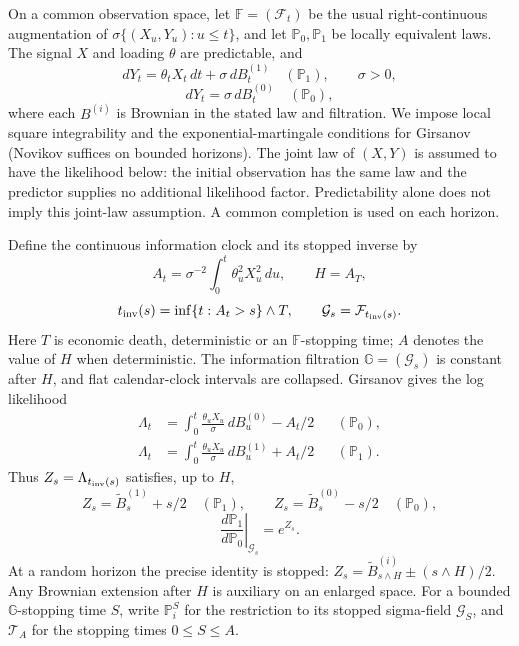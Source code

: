 \documentclass[11pt]{article}
\numberwithin{equation}{section}
\theoremstyle{plain}
\theoremstyle{definition}
\theoremstyle{remark}
\newcommand{\Pzero}{\mathbb P_0}
\newcommand{\Pone}{\mathbb P_1}
\newcommand{\Fobs}{\mathbb F}
\newcommand{\Ginfo}{\mathbb G}
\begin{document}
On a common observation space, let $\Fobs=(\mathcal F_t)$ be the usual right-continuous augmentation of $\sigma\{(X_u,Y_u):u\le t\}$, and let $\Pzero,\Pone$ be locally equivalent laws. The signal $X$ and loading $\theta$ are predictable, and
\begin{equation}\label{eq:observed-channel-alt}
dY_t=\theta_tX_t\,dt+\sigma\,dB_t^{(1)}\quad(\Pone),\qquad \sigma>0,
\end{equation}
\begin{equation}\label{eq:observed-channel-null}
dY_t=\sigma\,dB_t^{(0)}\quad(\Pzero),
\end{equation}
where each $B^{(i)}$ is Brownian in the stated law and filtration. We impose local square integrability and the exponential-martingale conditions for Girsanov (Novikov suffices on bounded horizons). The joint law of $(X,Y)$ is assumed to have the likelihood below: the initial observation has the same law and the predictor supplies no additional likelihood factor. Predictability alone does not imply this joint-law assumption. A common completion is used on each horizon.

Define the continuous information clock and its stopped inverse by
\begin{equation}\label{eq:information-clock}
A_t=\sigma^{-2}\int_0^t\theta_u^2X_u^2\,du,\qquad H=A_T,
\end{equation}
\begin{equation}\label{eq:inverse-information-clock}
t_{\rm inv}(s)=\inf\{t:A_t>s\}\wedge T,\qquad \mathcal G_s=\mathcal F_{t_{\rm inv}(s)}.
\end{equation}
Here $T$ is economic death, deterministic or an $\Fobs$-stopping time; $A$ denotes the value of $H$ when deterministic. The information filtration $\Ginfo=(\mathcal G_s)$ is constant after $H$, and flat calendar-clock intervals are collapsed. Girsanov gives the log likelihood
\begin{align}
\Lambda_t&=\int_0^t\frac{\theta_uX_u}{\sigma}\,dB_u^{(0)}-A_t/2 &&(\Pzero),\label{eq:llr-null}\\
\Lambda_t&=\int_0^t\frac{\theta_uX_u}{\sigma}\,dB_u^{(1)}+A_t/2 &&(\Pone).\label{eq:llr-alt}
\end{align}
Thus $Z_s=\Lambda_{t_{\rm inv}(s)}$ satisfies, up to $H$,
\begin{equation}\label{eq:information-time-likelihood}
Z_s=\widetilde B_s^{(1)}+s/2\quad(\Pone),\qquad Z_s=\widetilde B_s^{(0)}-s/2\quad(\Pzero),
\end{equation}
\begin{equation}\label{eq:information-time-rn}
\left.\frac{d\Pone}{d\Pzero}\right|_{\mathcal G_s}=e^{Z_s}.
\end{equation}
At a random horizon the precise identity is stopped: $Z_s=\widetilde B^{(i)}_{s\wedge H}\pm(s\wedge H)/2$. Any Brownian extension after $H$ is auxiliary on an enlarged space. For a bounded $\Ginfo$-stopping time $S$, write $\mathbb P_i^S$ for the restriction to its stopped sigma-field $\mathcal G_S$, and $\mathcal T_A$ for the stopping times $0\le S\le A$.
\end{document}
